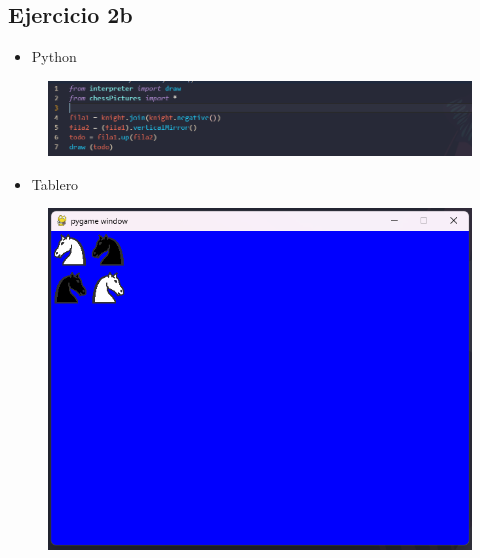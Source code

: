 \documentclass{article}
\begin{document}
	\subsection{Ejercicio 2b}
	\begin{itemize}
		\item Python
	\end{itemize}
	\begin{figure}[H]
		\centering
		\includegraphics[width=1.0\textwidth, keepaspectratio]{img/ejercicio2b}
	\end{figure}
	\begin{itemize}
		\item Tablero
	\end{itemize}
	\begin{figure}[H]
		\centering
		\includegraphics[width=1.0\textwidth, keepaspectratio]{img/ejercicio2bb}
	\end{figure}
	
\end{document}
